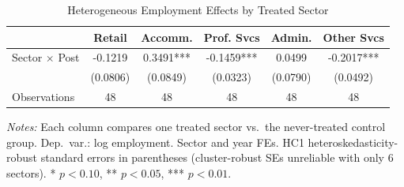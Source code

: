 \begin{table}[htbp]
\centering
\caption{Heterogeneous Employment Effects by Treated Sector}
\label{tab:heterogeneity}
\begin{tabular}{lccccc}
\toprule
 & Retail & Accomm. & Prof. Svcs & Admin. & Other Svcs \\
\midrule
Sector $\times$ Post & -0.1219 & 0.3491*** & -0.1459*** & 0.0499 & -0.2017*** \\
 & (0.0806) & (0.0849) & (0.0323) & (0.0790) & (0.0492) \\
\midrule
Observations & 48 & 48 & 48 & 48 & 48 \\
\bottomrule
\end{tabular}
\begin{minipage}{\textwidth}
\vspace{0.5em}
\footnotesize
\textit{Notes:} Each column compares one treated sector vs.\ the never-treated control group. Dep.~var.: log employment. Sector and year FEs. HC1 heteroskedasticity-robust standard errors in parentheses (cluster-robust SEs unreliable with only 6 sectors). * $p<0.10$, ** $p<0.05$, *** $p<0.01$.
\end{minipage}
\end{table}
